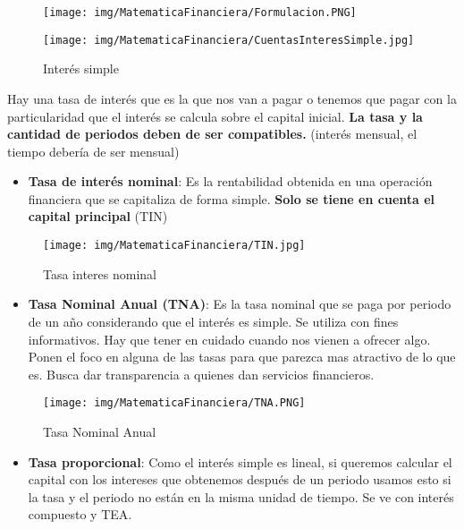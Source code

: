 \documentclass[titlepage,a4paper]{article}
\begin{document}
\begin{figure}[!htb]
    \centering
    \texttt{[image: img/MatematicaFinanciera/Formulacion.PNG]}
\end{figure}

\begin{figure}[!htb]
    \centering
    \texttt{[image: img/MatematicaFinanciera/CuentasInteresSimple.jpg]}
    \caption{Interés simple}
\end{figure}

Hay una tasa de interés que es la que nos van a pagar o tenemos que pagar con la particularidad que el interés se calcula sobre el capital inicial. \textbf{La tasa y la cantidad de periodos deben de ser compatibles.} (interés mensual, el tiempo debería de ser mensual)


\newpage
\begin{itemize}
\item \textbf{Tasa de interés nominal}: Es la rentabilidad obtenida en una operación financiera que se capitaliza de forma simple. \textbf{Solo se tiene en cuenta el capital principal} (TIN)
\end{itemize}

\begin{figure}[!htb]
    \centering
    \texttt{[image: img/MatematicaFinanciera/TIN.jpg]}
    \caption{Tasa interes nominal}
\end{figure}



\begin{itemize}
\item \textbf{Tasa Nominal Anual (TNA)}: Es la tasa nominal que se paga por periodo de un año considerando que el interés es simple. Se utiliza con fines informativos. Hay que tener en cuidado cuando nos vienen a ofrecer algo. Ponen el foco en alguna de las tasas para que parezca mas atractivo de lo que es. Busca dar transparencia a quienes dan servicios financieros.
\end{itemize}

\begin{figure}[!htb]
    \centering
    \texttt{[image: img/MatematicaFinanciera/TNA.PNG]}
    \caption{Tasa Nominal Anual}
\end{figure}


\newpage
\begin{itemize}
\item \textbf{Tasa proporcional}: Como el interés simple es lineal, si queremos calcular el capital con los intereses que obtenemos después de un periodo usamos esto si la tasa y el periodo no están en la misma unidad de tiempo. Se ve con interés compuesto y TEA.
\end{itemize}
\end{document}
